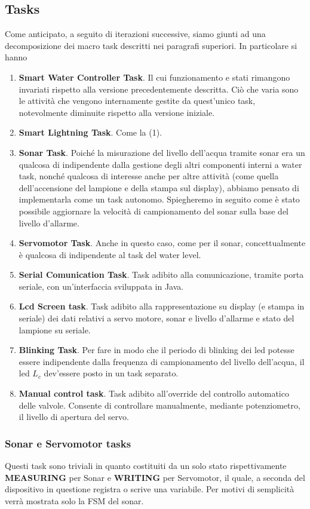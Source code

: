 \documentclass[a4paper,12pt]{report}
\begin{document}
\subsection{Tasks}
Come anticipato, a seguito di iterazioni successive, siamo giunti ad una decomposizione dei macro task descritti nei paragrafi superiori. In particolare si hanno
\begin{enumerate}
    \item \textbf{Smart Water Controller Task}. Il cui funzionamento e stati rimangono invariati rispetto alla versione precedentemente descritta. Ciò che varia sono le attività che vengono internamente gestite da quest'unico task, notevolmente diminuite rispetto alla versione iniziale.
    \item \textbf{Smart Lightning Task}. Come la (1).
    \item \textbf{Sonar Task}. Poiché la misurazione del livello dell'acqua tramite sonar era un qualcosa di indipendente dalla gestione degli altri componenti interni a water task, nonché qualcosa di interesse anche per altre attività (come quella dell'accensione del lampione e della stampa sul display), abbiamo pensato di implementarla come un task autonomo. Spiegheremo in seguito come è stato possibile aggiornare la velocità di campionamento del sonar sulla base del livello d'allarme.
    \item \textbf{Servomotor Task}. Anche in questo caso, come per il sonar, concettualmente è qualcosa di indipendente al task del water level. 
    \item \textbf{Serial Comunication Task}. Task adibito alla comunicazione, tramite porta seriale, con un'interfaccia sviluppata in Java.
    \item \textbf{Lcd Screen task}. Task adibito alla rappresentazione su display (e stampa in seriale) dei dati relativi a servo motore, sonar e livello d'allarme e stato del lampione su seriale. 
    \item \textbf{Blinking Task}. Per fare in modo che il periodo di blinking dei led potesse essere indipendente dalla frequenza di campionamento del livello dell'acqua, il led $L_c$ dev'essere posto in un task separato.
    \item \textbf{Manual control task}. Task adibito all'override del controllo automatico delle valvole. Consente di controllare manualmente, mediante potenziometro, il livello di apertura del servo.
\end{enumerate}

\subsubsection{Sonar e Servomotor tasks}
Questi task sono triviali in quanto costituiti da un solo stato rispettivamente \textbf{MEASURING} per Sonar e \textbf{WRITING} per Servomotor, il quale, a seconda del dispositivo in questione registra o scrive una variabile. Per motivi di semplicità verrà mostrata solo la FSM del sonar.
\end{document}
